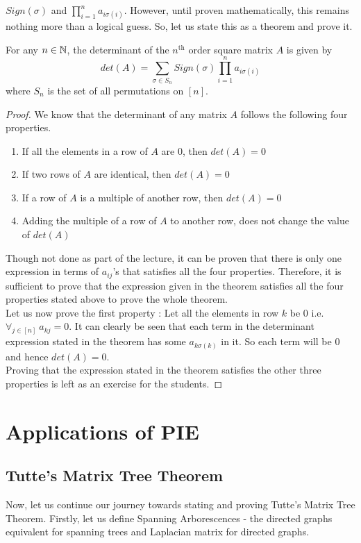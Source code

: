 $Sign(\sigma)$ and $\prod_{i=1}^{n} a_{i\sigma(i)}$. However, until proven mathematically, this remains nothing more than a logical guess. So, let us state this as a theorem and prove it.
\begin{theorem}
For any $n \in \mathbb{N}$, the determinant of the $n^{\text{th}}$ order square matrix $A$ is given by
$$det(A) = \sum_{\sigma \in S_n} Sign(\sigma)  \prod_{i=1}^{n} a_{i\sigma(i)}$$
where $S_n$ is the set of all permutations on $[n]$. 
\end{theorem}
\begin{proof}
We know that the determinant of any matrix $A$ follows the following four properties.
\begin{enumerate}
    \item If all the elements in a row of $A$ are 0, then $det(A)=0$
    \item If two rows of $A$ are identical, then $det(A)=0$
    \item If a row of $A$ is a multiple of another row, then $det(A)=0$
    \item Adding the multiple of a row of $A$ to another row, does not change the value of $det(A)$
\end{enumerate}
Though not done as part of the lecture, it can be proven that there is only one expression in terms of $a_{ij}$'s that satisfies all the four properties. Therefore, it is sufficient to prove that the expression given in the theorem satisfies all the four properties stated above to prove the whole theorem. \\
Let us now prove the first property : Let all the elements in row $k$ be 0 i.e. $\forall_{j\in[n]}~ a_{kj} = 0$. It can clearly be seen that each term in the determinant expression stated in the theorem has some $a_{k\sigma(k)}$ in it. So each term will be 0 and hence $det(A)=0$. \\
Proving that the expression stated in the theorem satisfies the other three properties is left as an exercise for the students.
\end{proof}

\section{Applications of PIE} \label{sec:Applications of PIE - lec3}
\subsection{Tutte’s Matrix Tree Theorem} \label{subsec:tutte's application}
 Now, let us continue our journey towards stating and proving Tutte's Matrix Tree Theorem. Firstly, let us define Spanning Arborescences - the directed graphs equivalent for spanning trees and Laplacian matrix for directed graphs.\\

